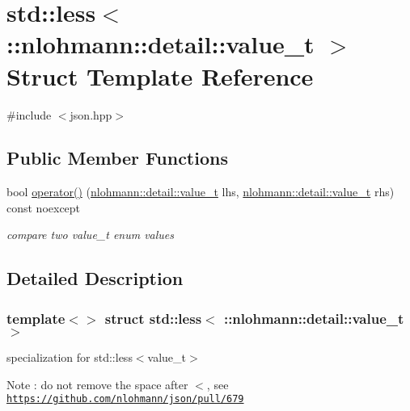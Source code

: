 \hypertarget{structstd_1_1less_3_01_1_1nlohmann_1_1detail_1_1value__t_01_4}{}\section{std\+:\+:less$<$ \+:\+:nlohmann\+:\+:detail\+:\+:value\+\_\+t $>$ Struct Template Reference}
\label{structstd_1_1less_3_01_1_1nlohmann_1_1detail_1_1value__t_01_4}


{\ttfamily \#include $<$json.\+hpp$>$}

\subsection*{Public Member Functions}
\begin{DoxyCompactItemize}
\item 
bool \mbox{\hyperlink{structstd_1_1less_3_01_1_1nlohmann_1_1detail_1_1value__t_01_4_a76d2a6c170cfd74f3b1882be1b5a6671}{operator()}} (\mbox{\hyperlink{namespacenlohmann_1_1detail_a1ed8fc6239da25abcaf681d30ace4985}{nlohmann\+::detail\+::value\+\_\+t}} lhs, \mbox{\hyperlink{namespacenlohmann_1_1detail_a1ed8fc6239da25abcaf681d30ace4985}{nlohmann\+::detail\+::value\+\_\+t}} rhs) const noexcept
\begin{DoxyCompactList}\small\item\em compare two value\+\_\+t enum values \end{DoxyCompactList}\end{DoxyCompactItemize}


\subsection{Detailed Description}
\subsubsection*{template$<$$>$\newline
struct std\+::less$<$ \+::nlohmann\+::detail\+::value\+\_\+t $>$}

specialization for std\+::less$<$value\+\_\+t$>$ \begin{DoxyNote}{Note}
\+: do not remove the space after \textquotesingle{}$<$\textquotesingle{}, see \href{https://github.com/nlohmann/json/pull/679}{\tt https\+://github.\+com/nlohmann/json/pull/679} 
\end{DoxyNote}


